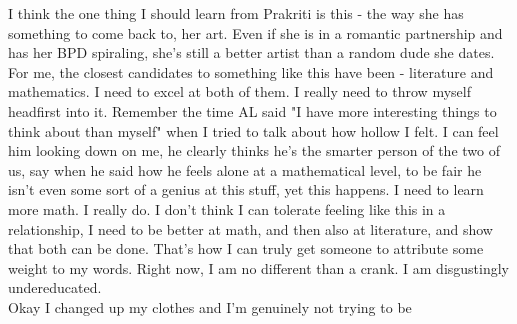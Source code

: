 \noindent {}

I think the one thing I should learn from Prakriti is this - the way she has something to come back to, her art. Even if she is in a romantic partnership and has her BPD spiraling, she's still a better artist than a random dude she dates. For me, the closest candidates to something like this have been - literature and mathematics. I need to excel at both of them. I really need to throw myself headfirst into it. Remember the time AL said "I have more interesting things to think about than myself" when I tried to talk about how hollow I felt. I can feel him looking down on me, he clearly thinks he's the smarter person of the two of us, say when he said how he feels alone at a mathematical level, to be fair he isn't even some sort of a genius at this stuff, yet this happens. I need to learn more math. I really do. I don't think I can tolerate feeling like this in a relationship, I need to be better at math, and then also at literature, and show that both can be done. That's how I can truly get someone to attribute some weight to my words. Right now, I am no different than a crank. I am disgustingly undereducated.\\

Okay I changed up my clothes and I'm genuinely not trying to be